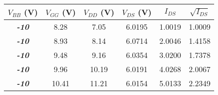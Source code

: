 \begin{tabular}{@{}cccccc@{}}
\toprule
\textbf{$V_{BB}$ (V)} & \multicolumn{1}{l}{\textbf{$V_{GG}$ (V)}} & \textbf{$V_{DD}$ (V)} & \textbf{$V_{DS}$ (V)} & \textbf{$I_{DS}$} & \textbf{$\sqrt{I_{DS}}$} \\ \midrule
\textit{\textbf{-10}}     & 8.28      & 7.05      & 6.0195      & 1.0019   & 1.0009   \\
\textit{\textbf{-10}}     & 8.93      & 8.14      & 6.0714      & 2.0046   & 1.4158      \\
\textit{\textbf{-10}}     & 9.48      & 9.16      & 6.0354       & 3.0200  & 1.7378   \\
\textit{\textbf{-10}}     & 9.96      & 10.19      & 6.0191      & 4.0268  & 2.0067    \\
\textit{\textbf{-10}}     & 10.41      &  11.21     &  6.0154     & 5.0133 & 2.2349     \\ \bottomrule
\end{tabular}